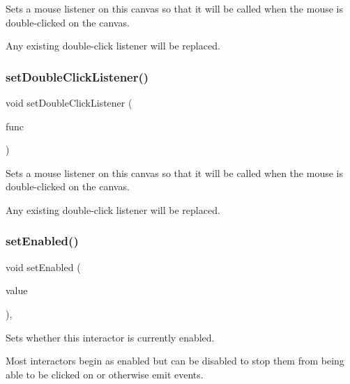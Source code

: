 Sets a mouse listener on this canvas so that it will be called when the mouse is double-\/clicked on the canvas. 

Any existing double-\/click listener will be replaced. \mbox{\label{classGCanvas_a50096194d66f48c92dd4c512d41bfc76}} 
\subsubsection{\texorpdfstring{set\+Double\+Click\+Listener()}{setDoubleClickListener()}\hspace{0.1cm}{\footnotesize\ttfamily [2/2]}}
{\footnotesize\ttfamily void set\+Double\+Click\+Listener (\begin{DoxyParamCaption}\item[{G\+Event\+Listener\+Void}]{func }\end{DoxyParamCaption})\hspace{0.3cm}{\ttfamily [virtual]}}



Sets a mouse listener on this canvas so that it will be called when the mouse is double-\/clicked on the canvas. 

Any existing double-\/click listener will be replaced. \mbox{\label{classGInteractor_ab831367dd84bbd579e02e55bacb21343}} 
\subsubsection{\texorpdfstring{set\+Enabled()}{setEnabled()}}
{\footnotesize\ttfamily void set\+Enabled (\begin{DoxyParamCaption}\item[{bool}]{value }\end{DoxyParamCaption})\hspace{0.3cm}{\ttfamily [virtual]}, {\ttfamily [inherited]}}



Sets whether this interactor is currently enabled. 

Most interactors begin as enabled but can be disabled to stop them from being able to be clicked on or otherwise emit events. \mbox{\label{classGObservable_ad2f6d34961c50f6c1e0659990b79f741}} 
